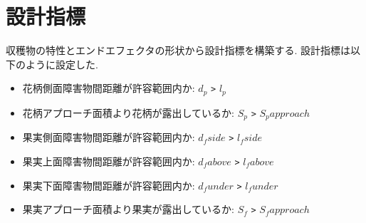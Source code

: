 \section{設計指標}
収穫物の特性とエンドエフェクタの形状から設計指標を構築する.
設計指標は以下のように設定した.

\begin{itemize}
  \item 花柄側面障害物間距離が許容範囲内か: $d_p$ \verb|>| $l_p$
  \item 花柄アプローチ面積より花柄が露出しているか: $S_p$ \verb|>| $S_papproach$
  \item 果実側面障害物間距離が許容範囲内か: $d_fside$ \verb|>| $l_fside$
  \item 果実上面障害物間距離が許容範囲内か: $d_fabove$ \verb|>| $l_fabove$
  \item 果実下面障害物間距離が許容範囲内か: $d_funder$ \verb|>| $l_funder$
  \item 果実アプローチ面積より果実が露出しているか: $S_f$ \verb|>| $S_fapproach$
\end{itemize}